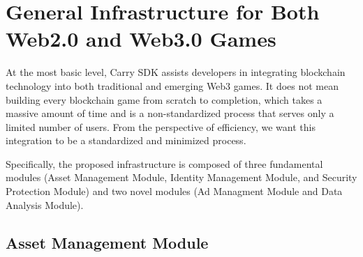 \section{General Infrastructure for Both Web2.0 and Web3.0 Games}


At the most basic level, Carry SDK assists developers in integrating blockchain technology into both traditional and emerging Web3 games. It does not mean building every blockchain game from scratch to completion, which takes a massive amount of time and is a non-standardized process that serves only a limited number of users. From the perspective of efficiency, we want this integration to be a standardized and minimized process.

Specifically, the proposed infrastructure is composed of three fundamental modules (Asset Management Module, Identity Management Module, and Security Protection Module) and two novel modules (Ad Managment Module and Data Analysis Module). 

\subsection{Asset Management Module}

